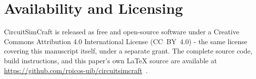 \section*{Availability and Licensing}

CircuitSimCraft is released as free and open-source software under a Creative Commons
Attribution 4.0 International License (CC~BY~4.0) - the same license covering this manuscript
itself, under a separate grant. The complete source code, build instructions, and this paper's
own \LaTeX{} source are available at
\url{https://github.com/rpicos-uib/circuitsimcraft}~\cite{picos2026circuitsimcraft}.
